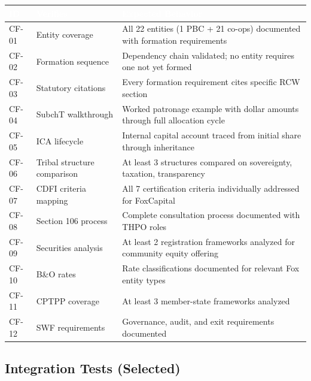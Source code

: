 \documentclass[11pt,letterpaper]{article}
\newcommand{\tableheader}[1]{\textbf{\sffamily\textcolor{white}{#1}}}
\begin{document}
\begin{center}
\begin{tabularx}{\textwidth}{C{1.2cm}L{3cm}X}
\toprule
{}
\tableheader{ID} & \tableheader{Verifies} & \tableheader{Expected Behavior} \\
\midrule
CF-01 & Entity coverage & All 22 entities (1 PBC + 21 co-ops) documented with formation requirements \\
CF-02 & Formation sequence & Dependency chain validated; no entity requires one not yet formed \\
CF-03 & Statutory citations & Every formation requirement cites specific RCW section \\
CF-04 & SubchT walkthrough & Worked patronage example with dollar amounts through full allocation cycle \\
CF-05 & ICA lifecycle & Internal capital account traced from initial share through inheritance \\
CF-06 & Tribal structure comparison & At least 3 structures compared on sovereignty, taxation, transparency \\
CF-07 & CDFI criteria mapping & All 7 certification criteria individually addressed for FoxCapital \\
CF-08 & Section 106 process & Complete consultation process documented with THPO roles \\
CF-09 & Securities analysis & At least 2 registration frameworks analyzed for community equity offering \\
CF-10 & B\&O rates & Rate classifications documented for relevant Fox entity types \\
CF-11 & CPTPP coverage & At least 3 member-state frameworks analyzed \\
CF-12 & SWF requirements & Governance, audit, and exit requirements documented \\
\bottomrule
\end{tabularx}
\end{center}

\subsection{Integration Tests (Selected)}
\end{document}
